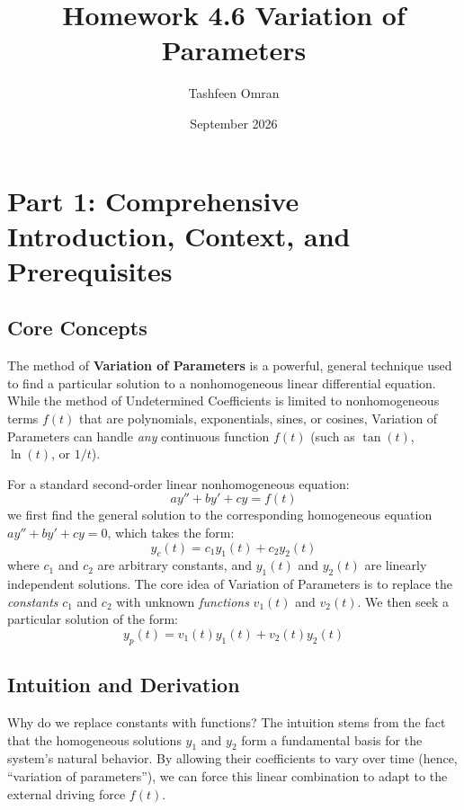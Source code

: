 \documentclass{article}
\title{Homework 4.6 Variation of Parameters}
\author{Tashfeen Omran}
\date{September 2026}
\begin{document}
\maketitle

\section{Part 1: Comprehensive Introduction, Context, and Prerequisites}

\subsection{Core Concepts}
The method of \textbf{Variation of Parameters} is a powerful, general technique used to find a particular solution to a nonhomogeneous linear differential equation. While the method of Undetermined Coefficients is limited to nonhomogeneous terms $f(t)$ that are polynomials, exponentials, sines, or cosines, Variation of Parameters can handle \textit{any} continuous function $f(t)$ (such as $\tan(t)$, $\ln(t)$, or $1/t$). 

For a standard second-order linear nonhomogeneous equation:
\[ a y'' + b y' + c y = f(t) \]
we first find the general solution to the corresponding homogeneous equation $a y'' + b y' + c y = 0$, which takes the form:
\[ y_c(t) = c_1 y_1(t) + c_2 y_2(t) \]
where $c_1$ and $c_2$ are arbitrary constants, and $y_1(t)$ and $y_2(t)$ are linearly independent solutions. The core idea of Variation of Parameters is to replace the \textit{constants} $c_1$ and $c_2$ with unknown \textit{functions} $v_1(t)$ and $v_2(t)$. We then seek a particular solution of the form:
\[ y_p(t) = v_1(t) y_1(t) + v_2(t) y_2(t) \]

\subsection{Intuition and Derivation}
Why do we replace constants with functions? The intuition stems from the fact that the homogeneous solutions $y_1$ and $y_2$ form a fundamental basis for the system's natural behavior. By allowing their coefficients to vary over time (hence, ``variation of parameters''), we can force this linear combination to adapt to the external driving force $f(t)$.
\end{document}
